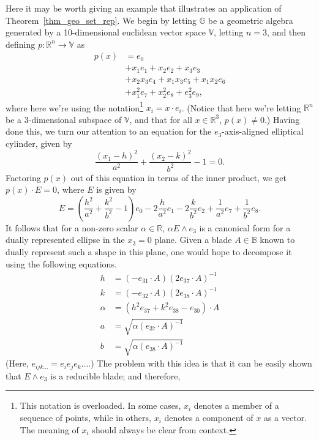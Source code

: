 \documentclass{birkjour}
\theoremstyle{definition}
\theoremstyle{remark}
\numberwithin{equation}{section}
\newcommand{\R}{\mathbb{R}}
\newcommand{\B}{\mathbb{B}}
\newcommand{\G}{\mathbb{G}}
\newcommand{\V}{\mathbb{V}}
\begin{document}
Here it may be worth giving an example that illustrates an application of Theorem~\ref{thm_geo_set_rep}.
We begin by letting $\G$ be a geometric algebra generated by a 10-dimensional euclidean vector space $\V$, letting $n=3$, and then defining
$p:\R^n\to\V$ as
\begin{align}
p(x) &= e_0 \nonumber\\
 &+ x_1e_1 + x_2e_2 + x_3e_3 \nonumber\\
 &+ x_2x_3e_4 + x_1x_3e_5 + x_1x_2e_6 \nonumber\\
 &+ x_1^2e_7 + x_2^2e_8 + e_3^2e_9,
\end{align}
where here we're using the notation\footnote{This notation is overloaded.  In some cases, $x_i$ denotes a member
of a sequence of points, while in others, $x_i$ denotes a component of $x$ as a vector.  The meaning of $x_i$ should
always be clear from context.} $x_i=x\cdot e_i$.  (Notice that here we're letting $\R^n$ be
a 3-dimensional subspace of $\V$, and that for all $x\in\R^3$, $p(x)\neq 0$.)  Having done this,
we turn our attention to an equation for the $e_3$-axis-aligned elliptical cylinder, given by
\begin{equation}
\frac{(x_1-h)^2}{a^2}+\frac{(x_2-k)^2}{b^2}-1=0.
\end{equation}
Factoring $p(x)$ out of this equation in terms of the inner product, we get $p(x)\cdot E=0$,
where $E$ is given by
\begin{equation}
E = \left(\frac{h^2}{a^2}+\frac{k^2}{b^2}-1\right)e_0-2\frac{h}{a^2}e_1-2\frac{k}{b^2}e_2+\frac{1}{a^2}e_7+\frac{1}{b^2}e_8.
\end{equation}
It follows that for a non-zero scalar $\alpha\in\R$, $\alpha E\wedge e_3$ is a canonical form for a dually represented ellipse in the $x_3=0$ plane.
Given a blade $A\in\B$ known to dually represent such a shape in this plane, one would hope to decompose it using the following equations.
\begin{align}
h &= (-e_{31}\cdot A)(2e_{37}\cdot A)^{-1}\label{equ_decompose_first} \\
k &= (-e_{32}\cdot A)(2e_{38}\cdot A)^{-1} \\
\alpha &= (h^2e_{37}+k^2e_{38}-e_{30})\cdot A \\
a &= \sqrt{\alpha(e_{37}\cdot A)^{-1}} \\
b &= \sqrt{\alpha(e_{38}\cdot A)^{-1}}\label{equ_decompose_last}
\end{align}
(Here, $e_{ijk\dots}=e_ie_je_k\dots$.)
The problem with this idea is that it can be easily shown that $E\wedge e_3$ is a reducible blade; and therefore,
\end{document}
